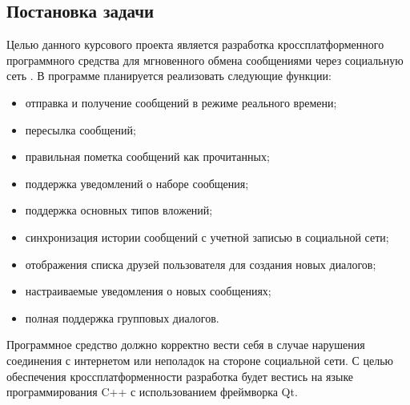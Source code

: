 \subsection{Постановка задачи}

Целью данного курсового проекта является разработка кроссплатформенного
программного средства \vkapp{} для мгновенного обмена сообщениями через
социальную сеть \vk{}. В программе планируется реализовать следующие функции:
\begin{itemize}
  \item отправка и получение сообщений в режиме реального времени;
  \item пересылка сообщений;
  \item правильная пометка сообщений как прочитанных;
  \item поддержка уведомлений о наборе сообщения;
  \item поддержка основных типов вложений;
  \item синхронизация истории сообщений с учетной записью в социальной сети;
  \item отображения списка друзей пользователя для создания новых диалогов;
  \item настраиваемые уведомления о новых сообщениях;
  \item полная поддержка групповых диалогов.
\end{itemize}

Программное средство должно корректно вести себя в случае нарушения соединения с
интернетом или неполадок на стороне социальной сети. С целью обеспечения
кроссплатформенности разработка будет вестись на языке программирования C++ с
использованием фреймворка Qt.








